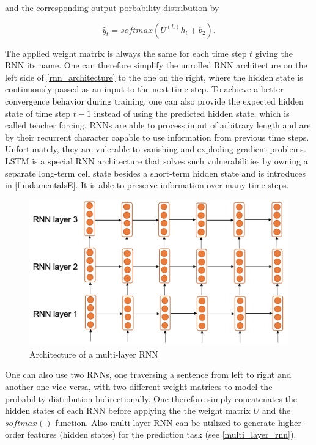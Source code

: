 and the corresponding output porbability distribution by 

\begin{equation}
	\hat{y}_t = softmax(U^{(h)} h_t + b_2).
\end{equation}

The applied weight matrix is always the same for each time step $t$ giving the \ac{RNN} its name. One can therefore simplify the unrolled \ac{RNN} architecture on the left side of \autoref{rnn_architecture} to the one on the right, where the hidden state is continuously passed as an input to the next time step. To achieve a better convergence behavior during training, one can also provide the expected hidden state of time step $t-1$ instead of using the predicted hidden state, which is called teacher forcing. \acp{RNN} are able to process input of arbitrary length and are by their recurrent character capable to use information from previous time steps. Unfortunately, they are vulerable to vanishing and exploding gradient problems. \ac{LSTM} is a special \ac{RNN} architecture that solves such vulnerabilities by owning a separate long-term cell state besides a short-term hidden state and is introduces in \autoref{fundamentalsE}. It is able to preserve information over many time steps. \cite{Gertz2020}

\begin{figure}[ht]
	\centering
	\includegraphics[width=0.8\linewidth]{figures/multi_layer_rnn.png}
	\caption{Architecture of a multi-layer  \ac{RNN} \cite{Gertz2020}}
	\label{multi_layer_rnn}
\end{figure}

One can also use two \acp{RNN}, one traversing a sentence from left to right and another one vice versa, with two different weight matrices to model the probability distribution bidirectionally. One therefore simply concatenates the hidden states of each \ac{RNN} before applying the the weight matrix $U$ and the $softmax()$ function. Also multi-layer \acs{RNN} can be utilized to generate higher-order features (hidden states) for the prediction task (see \autoref{multi_layer_rnn}). \cite{Gertz2020}

